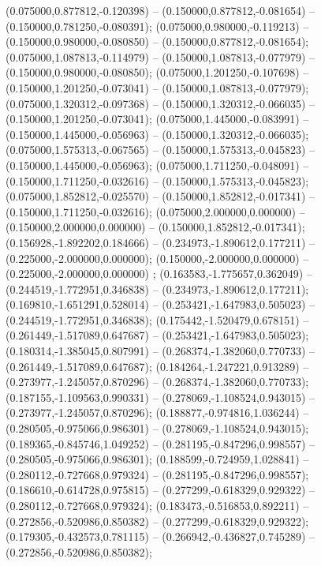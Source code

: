 (0.075000,0.877812,-0.120398) -- (0.150000,0.877812,-0.081654) -- (0.150000,0.781250,-0.080391);
 (0.075000,0.980000,-0.119213) -- (0.150000,0.980000,-0.080850) -- (0.150000,0.877812,-0.081654);
 (0.075000,1.087813,-0.114979) -- (0.150000,1.087813,-0.077979) -- (0.150000,0.980000,-0.080850);
 (0.075000,1.201250,-0.107698) -- (0.150000,1.201250,-0.073041) -- (0.150000,1.087813,-0.077979);
 (0.075000,1.320312,-0.097368) -- (0.150000,1.320312,-0.066035) -- (0.150000,1.201250,-0.073041);
 (0.075000,1.445000,-0.083991) -- (0.150000,1.445000,-0.056963) -- (0.150000,1.320312,-0.066035);
 (0.075000,1.575313,-0.067565) -- (0.150000,1.575313,-0.045823) -- (0.150000,1.445000,-0.056963);
 (0.075000,1.711250,-0.048091) -- (0.150000,1.711250,-0.032616) -- (0.150000,1.575313,-0.045823);
 (0.075000,1.852812,-0.025570) -- (0.150000,1.852812,-0.017341) -- (0.150000,1.711250,-0.032616);
 (0.075000,2.000000,0.000000) -- (0.150000,2.000000,0.000000) -- (0.150000,1.852812,-0.017341);
 (0.156928,-1.892202,0.184666) -- (0.234973,-1.890612,0.177211) -- (0.225000,-2.000000,0.000000);
 (0.150000,-2.000000,0.000000) -- (0.225000,-2.000000,0.000000) ;
 (0.163583,-1.775657,0.362049) -- (0.244519,-1.772951,0.346838) -- (0.234973,-1.890612,0.177211);
 (0.169810,-1.651291,0.528014) -- (0.253421,-1.647983,0.505023) -- (0.244519,-1.772951,0.346838);
 (0.175442,-1.520479,0.678151) -- (0.261449,-1.517089,0.647687) -- (0.253421,-1.647983,0.505023);
 (0.180314,-1.385045,0.807991) -- (0.268374,-1.382060,0.770733) -- (0.261449,-1.517089,0.647687);
 (0.184264,-1.247221,0.913289) -- (0.273977,-1.245057,0.870296) -- (0.268374,-1.382060,0.770733);
 (0.187155,-1.109563,0.990331) -- (0.278069,-1.108524,0.943015) -- (0.273977,-1.245057,0.870296);
 (0.188877,-0.974816,1.036244) -- (0.280505,-0.975066,0.986301) -- (0.278069,-1.108524,0.943015);
 (0.189365,-0.845746,1.049252) -- (0.281195,-0.847296,0.998557) -- (0.280505,-0.975066,0.986301);
 (0.188599,-0.724959,1.028841) -- (0.280112,-0.727668,0.979324) -- (0.281195,-0.847296,0.998557);
 (0.186610,-0.614728,0.975815) -- (0.277299,-0.618329,0.929322) -- (0.280112,-0.727668,0.979324);
 (0.183473,-0.516853,0.892211) -- (0.272856,-0.520986,0.850382) -- (0.277299,-0.618329,0.929322);
 (0.179305,-0.432573,0.781115) -- (0.266942,-0.436827,0.745289) -- (0.272856,-0.520986,0.850382);
